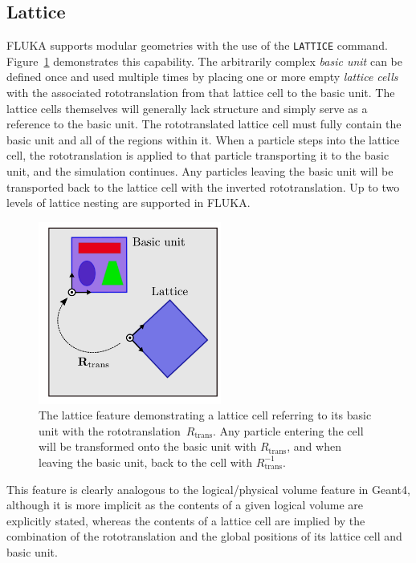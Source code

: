 \documentclass[final,5p,times,twocolumn]{elsarticle}
\newcommand{\fluka}[1]{\texttt{\MakeUppercase{#1}}}
\begin{document}
\subsection{Lattice}

FLUKA supports modular geometries with the use of the \fluka{lattice}
command. Figure~\ref{fig:lattice} demonstrates this capability. The
arbitrarily complex \emph{basic unit} can be defined once and used
multiple times by placing one or more empty \emph{lattice cells} with the
associated rototranslation from that lattice cell to the basic
unit. The lattice cells themselves will generally lack structure
and simply serve as a reference to the basic unit. The rototranslated
lattice cell must fully contain the basic unit and all of the regions
within it. When a particle steps into the lattice cell, the
rototranslation is applied to that particle transporting it to the
basic unit, and the simulation continues. Any
particles leaving the basic unit will be transported back to the
lattice cell with the inverted rototranslation. Up to two
levels of lattice nesting are supported in FLUKA.

\begin{figure}[hbtp]
\begin{center}
\includegraphics[width=6cm]{./diagrams/lattice}
\caption{The lattice feature demonstrating a lattice cell
  referring to its basic unit with the rototranslation~$R_\textrm{trans}$.
  Any particle entering the cell will be transformed onto the basic unit
  with $R_\textrm{trans}$, and when leaving the basic unit, back to the cell
  with $R_\textrm{trans}^{-1}$.}
\label{fig:lattice}
\end{center}
\end{figure}
This feature is clearly analogous to the logical/physical volume feature in
Geant4, although it is more implicit as the contents of a given logical
volume are explicitly stated, whereas the contents of a lattice cell
are implied by the combination of the rototranslation and the global positions of
its lattice cell and basic unit.
\end{document}

